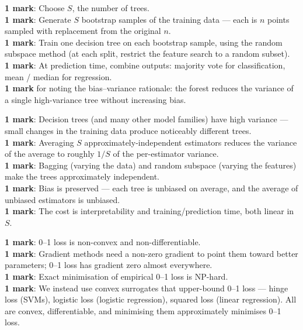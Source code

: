 \documentclass[11pt, a4paper]{article}
\begin{document}
\begin{exambox}
\textbf{1 mark}: Choose $S$, the number of trees. \\
\textbf{1 mark}: Generate $S$ bootstrap samples of the training data — each is $n$ points sampled with replacement from the original $n$. \\
\textbf{1 mark}: Train one decision tree on each bootstrap sample, using the random subspace method (at each split, restrict the feature search to a random subset). \\
\textbf{1 mark}: At prediction time, combine outputs: majority vote for classification, mean / median for regression. \\
\textbf{1 mark} for noting the bias--variance rationale: the forest reduces the variance of a single high-variance tree without increasing bias.
\end{exambox}

\begin{exambox}
\textbf{1 mark}: Decision trees (and many other model families) have high variance — small changes in the training data produce noticeably different trees. \\
\textbf{1 mark}: Averaging $S$ approximately-independent estimators reduces the variance of the average to roughly $1/S$ of the per-estimator variance. \\
\textbf{1 mark}: Bagging (varying the data) and random subspace (varying the features) make the trees approximately independent. \\
\textbf{1 mark}: Bias is preserved — each tree is unbiased on average, and the average of unbiased estimators is unbiased. \\
\textbf{1 mark}: The cost is interpretability and training/prediction time, both linear in $S$.
\end{exambox}

\begin{exambox}
\textbf{1 mark}: 0--1 loss is non-convex and non-differentiable. \\
\textbf{1 mark}: Gradient methods need a non-zero gradient to point them toward better parameters; 0--1 loss has gradient zero almost everywhere. \\
\textbf{1 mark}: Exact minimisation of empirical 0--1 loss is NP-hard. \\
\textbf{1 mark}: We instead use convex surrogates that upper-bound 0--1 loss — hinge loss (SVMs), logistic loss (logistic regression), squared loss (linear regression). All are convex, differentiable, and minimising them approximately minimises 0--1 loss.
\end{exambox}
\end{document}
